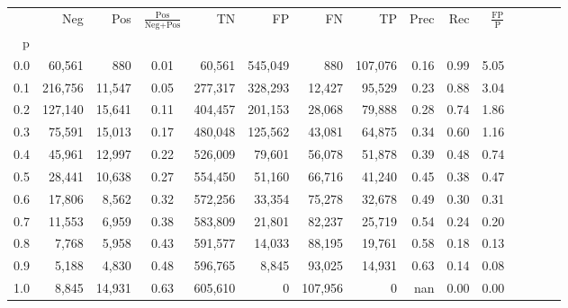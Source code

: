 \begin{tabular}{rrrcrrrrrrrrrrr}
\toprule
{} &      Neg &     Pos & $\frac{\text{Pos}}{\text{Neg}+\text{Pos}}$ &       TN &       FP &       FN &       TP &  Prec &   Rec & $\frac{\text{FP}}{\text{P}}$ \\
p   &          &         &                                            &          &          &          &          &       &       &                              \\
\midrule
0.0 &   60,561 &     880 &                                       0.01 &   60,561 &  545,049 &      880 &  107,076 &  0.16 &  0.99 &                         5.05 \\
0.1 &  216,756 &  11,547 &                                       0.05 &  277,317 &  328,293 &   12,427 &   95,529 &  0.23 &  0.88 &                         3.04 \\
0.2 &  127,140 &  15,641 &                                       0.11 &  404,457 &  201,153 &   28,068 &   79,888 &  0.28 &  0.74 &                         1.86 \\
0.3 &   75,591 &  15,013 &                                       0.17 &  480,048 &  125,562 &   43,081 &   64,875 &  0.34 &  0.60 &                         1.16 \\
0.4 &   45,961 &  12,997 &                                       0.22 &  526,009 &   79,601 &   56,078 &   51,878 &  0.39 &  0.48 &                         0.74 \\
0.5 &   28,441 &  10,638 &                                       0.27 &  554,450 &   51,160 &   66,716 &   41,240 &  0.45 &  0.38 &                         0.47 \\
0.6 &   17,806 &   8,562 &                                       0.32 &  572,256 &   33,354 &   75,278 &   32,678 &  0.49 &  0.30 &                         0.31 \\
0.7 &   11,553 &   6,959 &                                       0.38 &  583,809 &   21,801 &   82,237 &   25,719 &  0.54 &  0.24 &                         0.20 \\
0.8 &    7,768 &   5,958 &                                       0.43 &  591,577 &   14,033 &   88,195 &   19,761 &  0.58 &  0.18 &                         0.13 \\
0.9 &    5,188 &   4,830 &                                       0.48 &  596,765 &    8,845 &   93,025 &   14,931 &  0.63 &  0.14 &                         0.08 \\
1.0 &    8,845 &  14,931 &                                       0.63 &  605,610 &        0 &  107,956 &        0 &   nan &  0.00 &                         0.00 \\
\bottomrule
\end{tabular}
